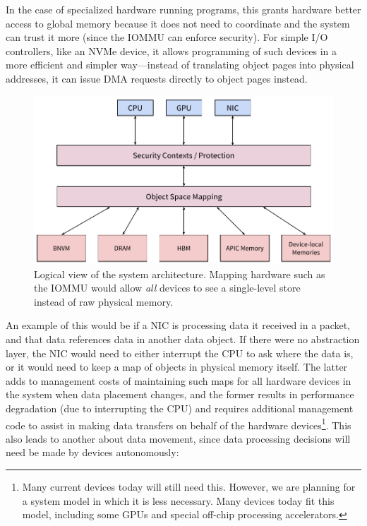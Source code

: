 {    

    In the case of specialized hardware running programs, this grants hardware better access to global
    memory because it does not need to coordinate and the system can trust it more (since the IOMMU can
    enforce security). For simple I/O controllers, like an NVMe device, it allows programming of such
    devices in a more efficient and simpler way---instead of translating object pages into physical
    addresses, it can issue DMA requests directly to object pages instead.


    \begin{figure}
        \centering
        \includegraphics[width=\linewidth]{fig/log_sys_arch}
        \caption{Logical view of the system architecture. Mapping hardware such as the IOMMU would allow
            \emph{all} devices to see a single-level store instead of raw physical memory.}
        \label{fig:log_sys_arch}
    \end{figure}


    An example of this would be if a NIC is processing data it received in a packet, and that data
    references data in another data object. If there were no abstraction layer, the NIC would need to
    either interrupt the CPU to ask where the data is, or it would need to keep a map of objects in
    physical memory itself. The latter adds to management costs of maintaining such maps for all
    hardware devices in the system when data placement changes, and the former results in performance
    degradation (due to interrupting the CPU) and requires additional management code to assist in
    making data transfers on behalf of the hardware devices\footnote{Many current devices today will
        still need this. However, we are planning for a system model in which it is less necessary. Many
        devices today fit this model, including some GPUs and special off-chip processing
        accelerators.}. This also leads to another \observation about data movement, since data
    processing decisions will need be made by devices autonomously:

}
